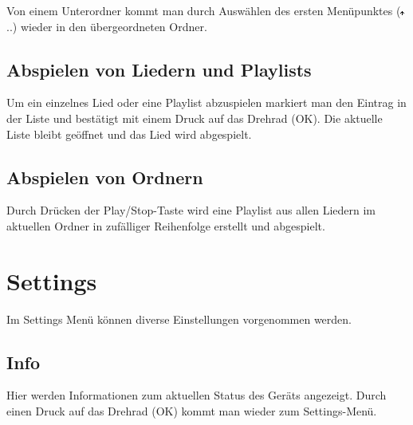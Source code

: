 \documentclass[12pt,a4paper,openany]{memoir}
\begin{document}
Von einem Unterordner kommt man durch Auswählen des ersten Menüpunktes (\includegraphics[width=5px]{images/up.png} ..) wieder in den übergeordneten Ordner.


\subsection{Abspielen von Liedern und Playlists}
Um ein einzelnes Lied oder eine Playlist abzuspielen markiert man den Eintrag in der Liste und bestätigt mit einem Druck auf das Drehrad (OK). Die aktuelle Liste bleibt geöffnet und das Lied wird abgespielt.

\subsection{Abspielen von Ordnern}
Durch Drücken der Play/Stop-Taste wird eine Playlist aus allen Liedern im aktuellen Ordner in zufälliger Reihenfolge erstellt und abgespielt. 


\section{Settings}

Im Settings Menü können diverse Einstellungen vorgenommen werden.


\subsection{Info}
Hier werden Informationen zum aktuellen Status des Geräts angezeigt. Durch einen Druck auf das Drehrad (OK) kommt man wieder zum Settings-Menü.
\end{document}
